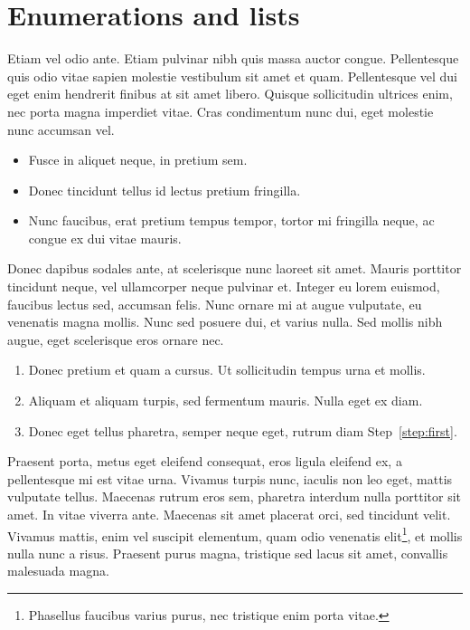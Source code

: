 \section{Enumerations and lists}

Etiam vel odio ante. Etiam pulvinar nibh quis massa auctor congue. Pellentesque quis odio vitae sapien molestie vestibulum sit amet et quam. Pellentesque vel dui eget enim hendrerit finibus at sit amet libero. Quisque sollicitudin ultrices enim, nec porta magna imperdiet vitae. Cras condimentum nunc dui, eget molestie nunc accumsan vel.

\begin{itemize}
	\item Fusce in aliquet neque, in pretium sem.
	\item Donec tincidunt tellus id lectus pretium fringilla.
	\item Nunc faucibus, erat pretium tempus tempor, tortor mi fringilla neque, ac congue ex dui vitae mauris.
\end{itemize}

Donec dapibus sodales ante, at scelerisque nunc laoreet sit amet. Mauris porttitor tincidunt neque, vel ullamcorper neque pulvinar et. Integer eu lorem euismod, faucibus lectus sed, accumsan felis. Nunc ornare mi at augue vulputate, eu venenatis magna mollis. Nunc sed posuere dui, et varius nulla. Sed mollis nibh augue, eget scelerisque eros ornare nec.

\begin{enumerate}
	\item\label{step:first} Donec pretium et quam a cursus. Ut sollicitudin tempus urna et mollis.
	\item Aliquam et aliquam turpis, sed fermentum mauris. Nulla eget ex diam.
	\item Donec eget tellus pharetra, semper neque eget, rutrum diam Step~\ref{step:first}.
\end{enumerate}

Praesent porta, metus eget eleifend consequat, eros ligula eleifend ex, a pellentesque mi est vitae urna. Vivamus turpis nunc, iaculis non leo eget, mattis vulputate tellus. Maecenas rutrum eros sem, pharetra interdum nulla porttitor sit amet. In vitae viverra ante. Maecenas sit amet placerat orci, sed tincidunt velit. Vivamus mattis, enim vel suscipit elementum, quam odio venenatis elit\footnote{Phasellus faucibus varius purus, nec tristique enim porta vitae.}, et mollis nulla nunc a risus. Praesent purus magna, tristique sed lacus sit amet, convallis malesuada magna. 